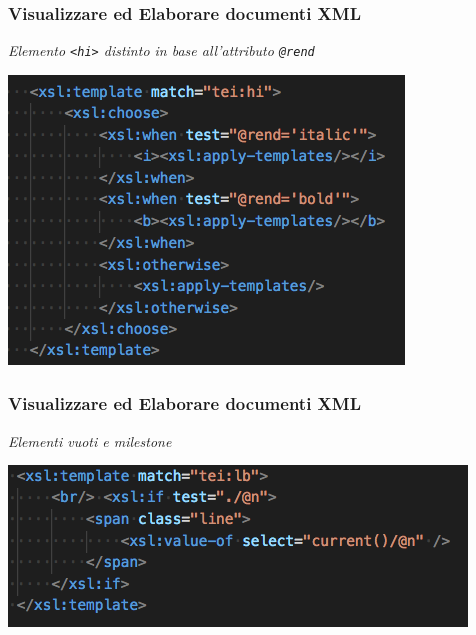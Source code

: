 \begin{frame}
    \frametitle{Visualizzare ed Elaborare documenti XML}
    \addtocounter{nframe}{1}
    
        \textit{Elemento \texttt{<hi>} distinto in base all'attributo \texttt{@rend}}

    \begin{center}
        \includegraphics[width=.8\textwidth]{imgs/EsempioCommentato10.png}
    \end{center}

\end{frame}

\begin{frame}
    \frametitle{Visualizzare ed Elaborare documenti XML}
    \addtocounter{nframe}{1}
    
        \textit{Elementi vuoti e milestone}

    \begin{center}
        \includegraphics[width=.8\textwidth]{imgs/EsempioCommentato11.png}
    \end{center}

\end{frame}




